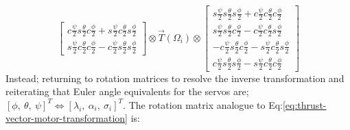 \begin{subequations}
\begin{equation}
\begin{bmatrix}
c\frac{\psi}{2}s\frac{\theta}{2}c\frac{\phi}{2}+s\frac{\psi}{2}c\frac{\theta}{2}s\frac{\phi}{2}\\
s\frac{\psi}{2}c\frac{\theta}{2}c\frac{\phi}{2}-c\frac{\psi}{2}s\frac{\theta}{2}s\frac{\phi}{2}
\end{bmatrix}
\otimes
\vec{T}(\Omega_i)
\otimes
\begin{bmatrix}
s\frac{\psi}{2}s\frac{\theta}{2}s\frac{\phi}{2}+c\frac{\psi}{2}c\frac{\theta}{2}c\frac{\phi}{2}\\
s\frac{\psi}{2}s\frac{\theta}{2}c\frac{\phi}{2}-c\frac{\psi}{2}c\frac{\theta}{2}s\frac{\phi}{2}\\
-c\frac{\psi}{2}s\frac{\theta}{2}c\frac{\phi}{2}-s\frac{\psi}{2}c\frac{\theta}{2}s\frac{\phi}{2}\\
c\frac{\psi}{2}s\frac{\theta}{2}s\frac{\phi}{2}-s\frac{\psi}{2}c\frac{\theta}{2}c\frac{\phi}{2}
\end{bmatrix}
\end{equation}
\end{subequations}
Instead; returning to rotation matrices to resolve the inverse transformation and reiterating that Euler angle equivalents for the servos are; $[\phi,~\theta,~\psi]^T\iff [\lambda_i,~\alpha_i,~\sigma_i]^T$. The rotation matrix analogue to Eq:\ref{eq:thrust-vector-motor-transformation} is:
